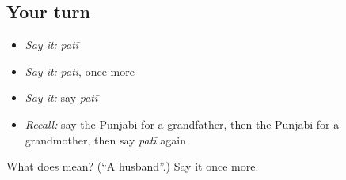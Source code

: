 \subsection*{Your turn}
\begin{itemize}
\raggedright
  \item \emph{Say it:} \emph{patī}
  \item \emph{Say it:} \emph{patī}, once more
  \item \emph{Say it:} say \emph{patī}
  \item \emph{Recall:} say the Punjabi for a grandfather, then the Punjabi for a grandmother, then say \emph{patī} again
\end{itemize}

\begin{tcolorbox}[breakable,colback=teal!4,colframe=teal!35!black,title={Before you move on}]
What does  mean? (\textquotedblleft{}A husband\textquotedblright{}.) Say it once more.
\end{tcolorbox}
